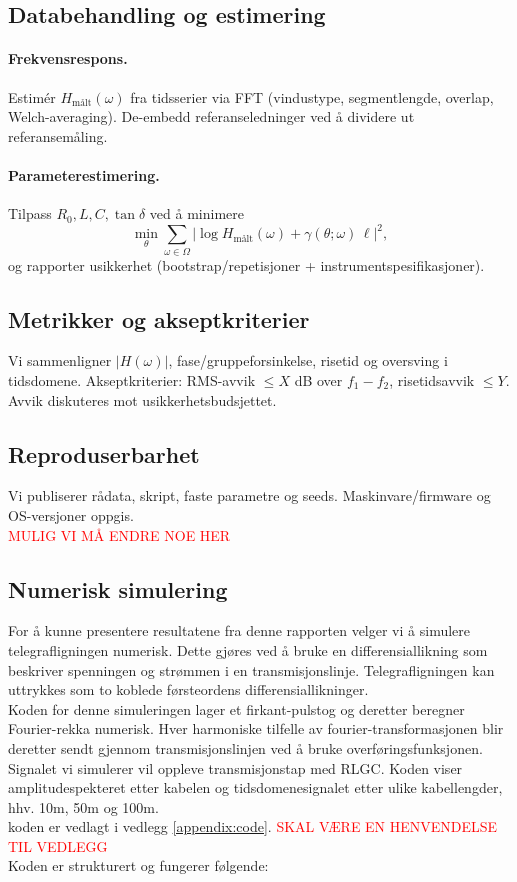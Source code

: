 \subsection{Databehandling og estimering}
\paragraph{Frekvensrespons.}
Estimér $H_\text{målt}(\omega)$ fra tidsserier via FFT (vindustype, segmentlengde, overlap, Welch-averaging). De-embedd referanseledninger ved å dividere ut referansemåling.

\paragraph{Parameterestimering.}
Tilpass $R_0, L, C, \tan\delta$ ved å minimere
\[
\min_\theta \sum_{\omega\in\Omega} \left|\log H_\text{målt}(\omega) + \gamma(\theta;\omega)\,\ell\right|^2,
\]
og rapporter usikkerhet (bootstrap/repetisjoner + instrumentspesifikasjoner).

\subsection{Metrikker og akseptkriterier}
Vi sammenligner $|H(\omega)|$, fase/gruppeforsinkelse, risetid og oversving i tidsdomene. Akseptkriterier:
RMS-avvik $\leq X$ dB over $f_1 - f_2$, risetidsavvik $\leq Y$. Avvik diskuteres mot usikkerhetsbudsjettet.

\subsection{Reproduserbarhet}
Vi publiserer rådata, skript, faste parametre og seeds. Maskinvare/firmware og OS-versjoner oppgis. \\ \textcolor{red}{MULIG VI MÅ ENDRE NOE HER}





\subsection{Numerisk simulering}
For å kunne presentere resultatene fra denne rapporten velger vi å simulere telegrafligningen numerisk. Dette gjøres ved å bruke en differensiallikning som beskriver spenningen og strømmen i en transmisjonslinje. Telegrafligningen kan uttrykkes som to koblede førsteordens differensiallikninger. \\ Koden for denne simuleringen lager et firkant-pulstog og deretter beregner Fourier-rekka numerisk. Hver harmoniske tilfelle av fourier-transformasjonen blir deretter sendt gjennom transmisjonslinjen ved å bruke overføringsfunksjonen. Signalet vi simulerer vil oppleve transmisjonstap med RLGC. Koden viser amplitudespekteret etter kabelen og tidsdomenesignalet etter ulike kabellengder, hhv. 10m, 50m og 100m. \\ koden er vedlagt i vedlegg \ref{appendix:code}. \textcolor{red}{SKAL VÆRE EN HENVENDELSE TIL VEDLEGG} \\ Koden er strukturert og fungerer følgende:



